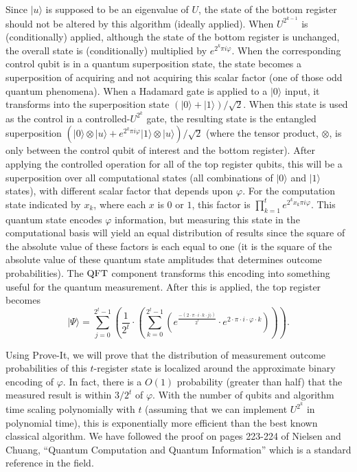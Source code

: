 \documentclass{article}[12pt]
\begin{document}
Since $\lvert u \rangle$ is supposed to be an eigenvalue of $U$, the state of the bottom register should not be altered by this algorithm (ideally applied).  When $U^{2^{k-1}}$ is (conditionally) applied, although the state of the bottom register is unchanged, the overall state is (conditionally) multiplied by $e^{2^k \pi i \varphi}$.  When the corresponding control qubit is in a quantum superposition state, the state becomes a superposition of acquiring and not acquiring this scalar factor (one of those odd quantum phenomena).  When a Hadamard gate is applied to a $\lvert 0 \rangle$ input, it transforms into the superposition state $\left(\lvert 0 \rangle + \lvert 1 \rangle\right)/\sqrt{2}$.  When this state is used as the control in a controlled-$U^{2^k}$ gate, the resulting state is the entangled superposition $\left(\lvert 0 \rangle \otimes \lvert u \rangle + e^{2^k \pi i \varphi} \lvert 1 \rangle \otimes \lvert u \rangle \right)/\sqrt{2}$ (where the tensor product, $\otimes$, is only between the control qubit of interest and the bottom register).  After applying the controlled operation for all of the top register qubits, this will be a superposition over all computational states (all combinations of $\lvert 0 \rangle$ and $\lvert 1 \rangle$ states), with different scalar factor that depends upon $\varphi$.  For the computation state indicated by $x_k$, where each $x$ is $0$ or $1$, this factor is $\prod_{k=1}^t e^{2^k x_k \pi i \varphi}$.  This quantum state encodes $\varphi$ information, but measuring this state in the computational basis will yield an equal distribution of results since the square of the absolute value of these factors is each equal to one (it is the square of the absolute value of these quantum state amplitudes that determines outcome probabilities).  The ${\rm QFT}$ component transforms this encoding into something useful for the quantum measurement.  After this is applied, the top register becomes
\begin{equation}
  \lvert \Psi \rangle = \sum_{j=0}^{2^{t} - 1} \left(\frac{1}{2^{t}} \cdot \left(\sum_{k=0}^{2^{t} - 1} \left(e^{\frac{-\left(2 \cdot \pi \cdot i \cdot k \cdot j)\right)}{2^{t}}} \cdot e^{2 \cdot \pi \cdot i \cdot \varphi \cdot k}\right)\right)\right).
\end{equation}

Using Prove-It, we will prove that the distribution of measurement outcome probabilities of this $t$-register state is localized around the approximate binary encoding of $\varphi$.  In fact, there is a $O(1)$ probability (greater than half) that the measured result is within $3/2^{t}$ of $\varphi$.  With the number of qubits and algorithm time scaling polynomially with $t$ (assuming that we can implement $U^{2^k}$ in polynomial time), this is exponentially more efficient than the best known classical algorithm.  We have followed the proof on pages 223-224 of Nielsen and Chuang, “Quantum Computation and Quantum Information” which is a standard reference in the field.
\end{document}
